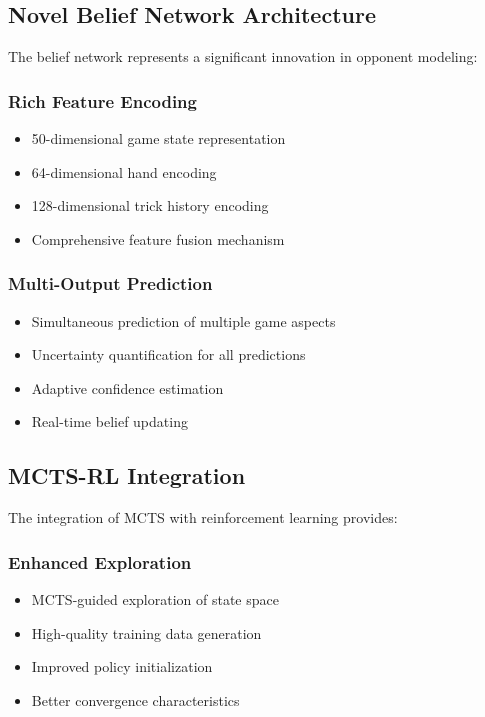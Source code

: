 \documentclass[conference]{IEEEtran}
\begin{document}
\subsection{Novel Belief Network Architecture}

The belief network represents a significant innovation in opponent modeling:

\subsubsection{Rich Feature Encoding}
\begin{itemize}
    \item 50-dimensional game state representation
    \item 64-dimensional hand encoding
    \item 128-dimensional trick history encoding
    \item Comprehensive feature fusion mechanism
\end{itemize}

\subsubsection{Multi-Output Prediction}
\begin{itemize}
    \item Simultaneous prediction of multiple game aspects
    \item Uncertainty quantification for all predictions
    \item Adaptive confidence estimation
    \item Real-time belief updating
\end{itemize}

\subsection{MCTS-RL Integration}

The integration of MCTS with reinforcement learning provides:

\subsubsection{Enhanced Exploration}
\begin{itemize}
    \item MCTS-guided exploration of state space
    \item High-quality training data generation
    \item Improved policy initialization
    \item Better convergence characteristics
\end{itemize}
\end{document}
